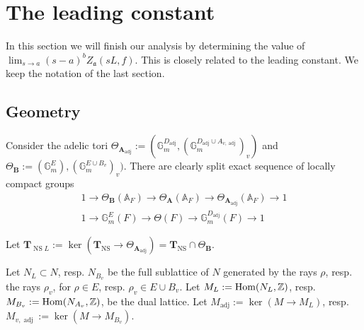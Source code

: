 \documentclass[a4paper,11pt,reqno]{amsart}
\newcommand{\G}{\mathbb{G}}
\newcommand{\A}{\mathbb{A}}
\DeclareMathOperator{\Hom}{Hom}
\DeclareMathOperator{\NS}{NS}
\DeclareMathOperator{\adj}{adj}
\theoremstyle{definition}
\begin{document}
\section{The leading constant}
In this section we will finish our analysis by determining the value of $\lim_{s \to a}(s - a)^bZ_{\mathfrak{a}}(s L, f)$. This is closely related to the leading constant. We keep the notation of the last section.
\subsection{Geometry}
Consider the adelic tori $\Theta_{\mathbf{A}_{\adj}} := (\G_m^{D_{\adj}}, (\G_m^{D_{\adj} \cup A_{v, \adj}})_v)$ and $\Theta_{\mathbf{B}} := (\G_m^{E}), (\G_m^{E \cup B_v})_v)$. There are clearly split exact sequence of locally compact groups
\begin{align}\label{eq:Split exact sequence A, B and A_adj adelic}
	1 \to \Theta_{\mathbf{B}}(\A_F) \to \Theta_{\mathbf{A}}(\A_F) \to \Theta_{\mathbf{A}_{\adj}}(\A_F) \to 1 \\
	\label{eq:Split exact sequence A, B and A_adj global}
	1 \to \G_m^E(F) \to \Theta(F) \to \G_m^{D_{\adj}}(F) \to 1
\end{align} 

Let $\mathbf{T}_{\NS L} := \ker(\mathbf{T}_{\NS} \to \Theta_{\mathbf{A}_{\adj}}) = \mathbf{T}_{\NS} \cap \Theta_{\mathbf{B}}$.

Let $N_L \subset N$, resp. $N_{B_v}$ be the full sublattice of $N$ generated by the rays $\rho$, resp. the rays $\rho_v$, for $\rho \in E$, resp. $\rho_v \in E \cup B_v$. Let $M_L := \Hom(N_L, \Z)$, resp. $M_{B_v} := \Hom(N_{A_v}, \Z)$, be the dual lattice. Let $M_{\adj} := \ker(M \to M_{L})$, resp. $M_{v, \adj} := \ker(M \to M_{B_v})$. 
\end{document}
